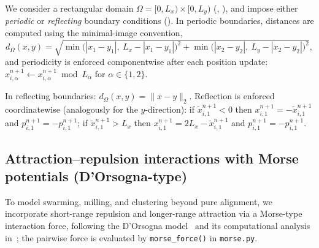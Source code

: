\documentclass{report}
\theoremstyle{plain}
\theoremstyle{remark}
\numberwithin{equation}{section}              %
\begin{document}
We consider a rectangular domain $\Omega = [0,L_x)\times[0,L_y)$ (, ),
and impose either \emph{periodic} or \emph{reflecting} boundary conditions (). In periodic boundaries, distances are computed using the minimal-image convention,
\[
d_\Omega(x,y)
=
\sqrt{
\min\!\big(|x_1-y_1|,\ L_x-|x_1-y_1|\big)^2
+
\min\!\big(|x_2-y_2|,\ L_y-|x_2-y_2|\big)^2
},
\]
and periodicity is enforced componentwise after each position update: $x_{i,\alpha}^{n+1} \leftarrow x_{i,\alpha}^{n+1} \bmod L_\alpha$ for $\alpha\in\{1,2\}$.

In reflecting boundaries: $d_\Omega(x,y)=\|x-y\|_2$.  Reflection is enforced coordinatewise (analogously for the $y$-direction): if $\tilde x_{i,1}^{n+1}<0$ then $x_{i,1}^{n+1}=-\tilde x_{i,1}^{n+1}$ and $p_{i,1}^{n+1}=-p_{i,1}^{n+1}$; if $\tilde x_{i,1}^{n+1}>L_x$ then $x_{i,1}^{n+1}=2L_x-\tilde x_{i,1}^{n+1}$ and $p_{i,1}^{n+1}=-p_{i,1}^{n+1}$.

%
%
%
\subsection{Attraction--repulsion interactions with Morse potentials (D'Orsogna-type)}
\label{sec:morse_forces}

To model swarming, milling, and clustering beyond pure alignment, we incorporate short-range
repulsion and longer-range attraction via a Morse-type interaction force, following the D'Orsogna
model~\cite{dorsogna2006morse} and its computational analysis in~\cite{bhaskar2019topology};
the pairwise force is evaluated by \texttt{morse\_force()} in \texttt{morse.py}.
\end{document}
